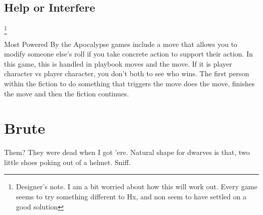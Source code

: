 \documentclass{tufte-book}
\begin{document}
\section{Help or Interfere}\footnote{Designer's note. I am a bit worried about how this will work out. Every game seems to try something different to Hx, and non seem to have settled on a good solution}

Most Powered By the Apocalypse games include a move that allows you to modify someone else's roll if you take concrete action to support their action. In this game, this is handled in playbook moves and the  move. If it is player character vs player character, you don't both  to see who wins. The first person within the fiction to do something that triggers the move does the move, finishes the move and then the fiction continues.



\chapter{Brute}

Them? They were dead when I got 'ere. Natural shape for dwarves is that, two little shoes poking out of a helmet. Sniff.


\end{document}
